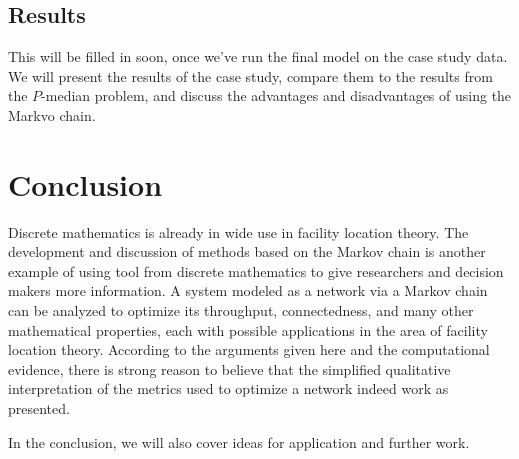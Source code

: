 \documentclass[twoside,twocolumn]{article}
\begin{document}

\subsection{Results}

This will be filled in soon, once we've run the final model on the case study data.
We will present the results of the case study, compare them to the results from the $P$-median problem, and discuss the advantages and disadvantages of using the Markvo chain.









\section{Conclusion}

Discrete mathematics is already in wide use in facility location theory. %
The development and discussion of methods based on the Markov chain is another example of using tool from discrete mathematics to give researchers and decision makers more information.
A system modeled as a network via a Markov chain can be analyzed to optimize its throughput, connectedness, and many other mathematical properties, each with possible applications in the area of facility location theory.
According to the arguments given here and the computational evidence, there is strong reason to believe that the simplified qualitative interpretation of the metrics used to optimize a network indeed work as presented.

In the conclusion, we will also cover ideas for application and further work.

\end{document}
